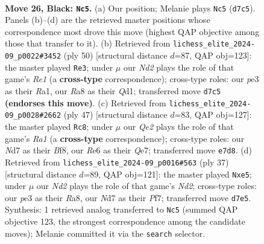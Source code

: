 \documentclass[11pt]{article}
\begin{document}
\clearpage

\begin{figure}[p]\centering
\begin{subfigure}{0.46\textwidth}\centering
\resizebox{\linewidth}{!}{%
\newchessgame
\chessboard[
  setfen={r1b3k1/1p1nq2p/4r3/p2QNpp1/8/4P1P1/P4PKP/BR2R3 b - - 1 26},
  showmover=false,
  pgfstyle=straightmove, color=movearrow, markmove={d7-c5}
]}
\caption{}
\end{subfigure}\hfill
\begin{subfigure}{0.46\textwidth}\centering
\resizebox{\linewidth}{!}{%
\newchessgame
\chessboard[
  setfen={r4r1k/6pp/p1n5/1ppB4/5n2/2PP2qP/PP4N1/R2QR1K1 w - - 1 26},
  showmover=false,
  pgfstyle=straightmove, color=movearrow, markmove={e1-e3}
]}
\caption{}
\end{subfigure}
\\[4pt]
\begin{subfigure}{0.46\textwidth}\centering
\resizebox{\linewidth}{!}{%
\newchessgame
\chessboard[
  setfen={r4b1k/pp2q1p1/3pNnBr/3P2Qp/8/5R1P/PP4P1/5RK1 b - - 2 24},
  showmover=false,
  pgfstyle=straightmove, color=movearrow, markmove={a8-c8}
]}
\caption{}
\end{subfigure}\hfill
\begin{subfigure}{0.46\textwidth}\centering
\resizebox{\linewidth}{!}{%
\newchessgame
\chessboard[
  setfen={r2qr1k1/pp1n1pp1/7p/P1bQN3/5B2/7P/2P2PP1/R3R1K1 b - - 0 19},
  showmover=false,
  pgfstyle=straightmove, color=movearrow, markmove={d7-e5}
]}
\caption{}
\end{subfigure}
\caption{\textbf{Move 26, Black: \texttt{Nc5}.} (a) Our position; Melanie plays \texttt{Nc5} (\texttt{d7c5}). Panels (b)--(d) are the retrieved master positions whose correspondence most drove this move (highest QAP objective among those that transfer to it). (b) Retrieved from \texttt{lichess\_elite\_2024-09\_p0022\#3452} (ply 50) [structural distance $d$=87, QAP obj=123]: the master played \texttt{Re3}; under $\mu$ our \emph{Nd2} plays the role of that game's \emph{Re1} (a \textbf{cross-type} correspondence); cross-type roles: our \emph{p}e3 as their \emph{R}a1, our \emph{R}a8 as their \emph{Q}d1; transferred move \texttt{d7c5} \textbf{(endorses this move)}. (c) Retrieved from \texttt{lichess\_elite\_2024-09\_p0028\#2662} (ply 47) [structural distance $d$=83, QAP obj=127]: the master played \texttt{Rc8}; under $\mu$ our \emph{Qe2} plays the role of that game's \emph{Ra1} (a \textbf{cross-type} correspondence); cross-type roles: our \emph{N}d7 as their \emph{B}f8, our \emph{R}e6 as their \emph{Q}e7; transferred move \texttt{e7d8}. (d) Retrieved from \texttt{lichess\_elite\_2024-09\_p0016\#563} (ply 37) [structural distance $d$=89, QAP obj=121]: the master played \texttt{Nxe5}; under $\mu$ our \emph{Nd2} plays the role of that game's \emph{Nd2}; cross-type roles: our \emph{p}e3 as their \emph{R}a8, our \emph{N}d7 as their \emph{P}f7; transferred move \texttt{d7e5}. Synthesis: 1 retrieved analog transferred to \texttt{Nc5} (summed QAP objective 123, the strongest correspondence among the candidate moves); Melanie committed it via the \texttt{search} selector.}
\label{fig:thought-m51}
\end{figure}
\end{document}
